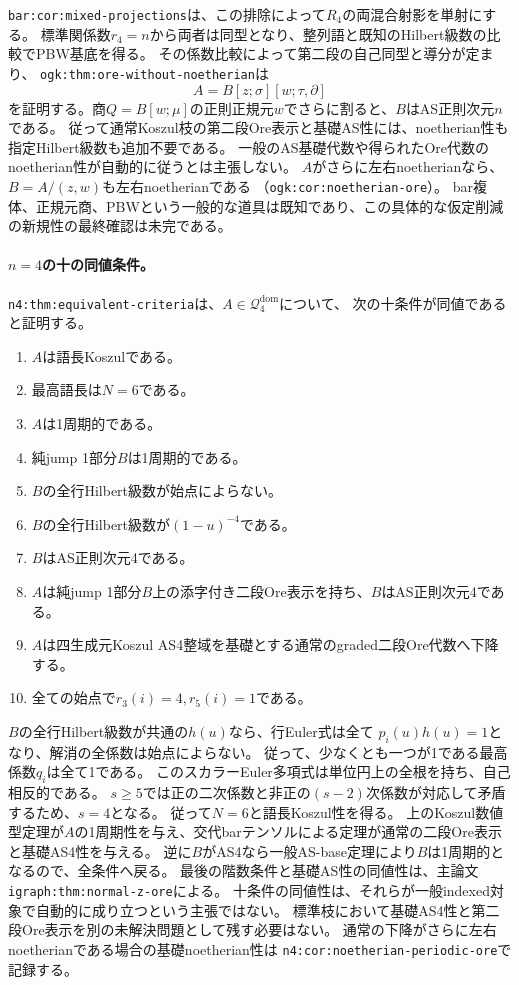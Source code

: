 \documentclass[11pt,a4paper]{ltjsarticle}
\begin{document}
\texttt{bar:cor:mixed-projections}は、この排除によって$R_4$の両混合射影を単射にする。
標準関係数$r_4=n$から両者は同型となり、整列語と既知のHilbert級数の比較でPBW基底を得る。
その係数比較によって第二段の自己同型と導分が定まり、
\texttt{ogk:thm:ore-without-noetherian}は
\[
A=B[z;\sigma][w;\tau,\partial]
\]
を証明する。商$Q=B[w;\mu]$の正則正規元$w$でさらに割ると、$B$はAS正則次元$n$である。
従って通常Koszul枝の第二段Ore表示と基礎AS性には、noetherian性も指定Hilbert級数も追加不要である。
一般のAS基礎代数や得られたOre代数のnoetherian性が自動的に従うとは主張しない。
$A$がさらに左右noetherianなら、$B=A/(z,w)$も左右noetherianである
（\texttt{ogk:cor:noetherian-ore}）。
bar複体、正規元商、PBWという一般的な道具は既知であり、この具体的な仮定削減の新規性の最終確認は未完である。

\paragraph{$n=4$の十の同値条件。}
\texttt{n4:thm:equivalent-criteria}は、$A\in\mathcal Q_4^{\mathrm{dom}}$について、
次の十条件が同値であると証明する。
\begin{enumerate}
\item $A$は語長Koszulである。
\item 最高語長は$N=6$である。
\item $A$は1周期的である。
\item 純jump 1部分$B$は1周期的である。
\item $B$の全行Hilbert級数が始点によらない。
\item $B$の全行Hilbert級数が$(1-u)^{-4}$である。
\item $B$はAS正則次元4である。
\item $A$は純jump 1部分$B$上の添字付き二段Ore表示を持ち、$B$はAS正則次元4である。
\item $A$は四生成元Koszul AS4整域を基礎とする通常のgraded二段Ore代数へ下降する。
\item 全ての始点で$r_3(i)=4,r_5(i)=1$である。
\end{enumerate}
$B$の全行Hilbert級数が共通の$h(u)$なら、行Euler式は全て
$p_i(u)h(u)=1$となり、解消の全係数は始点によらない。
従って、少なくとも一つが1である最高係数$q_i$は全て1である。
このスカラーEuler多項式は単位円上の全根を持ち、自己相反的である。
$s\geq5$では正の二次係数と非正の$(s-2)$次係数が対応して矛盾するため、$s=4$となる。
従って$N=6$と語長Koszul性を得る。
上のKoszul数値型定理が$A$の1周期性を与え、交代barテンソルによる定理が通常の二段Ore表示と基礎AS4性を与える。
逆に$B$がAS4なら一般AS-base定理により$B$は1周期的となるので、全条件へ戻る。
最後の階数条件と基礎AS性の同値性は、主論文\texttt{igraph:thm:normal-z-ore}による。
十条件の同値性は、それらが一般indexed対象で自動的に成り立つという主張ではない。
標準枝において基礎AS4性と第二段Ore表示を別の未解決問題として残す必要はない。
通常の下降がさらに左右noetherianである場合の基礎noetherian性は
\texttt{n4:cor:noetherian-periodic-ore}で記録する。
\end{document}
